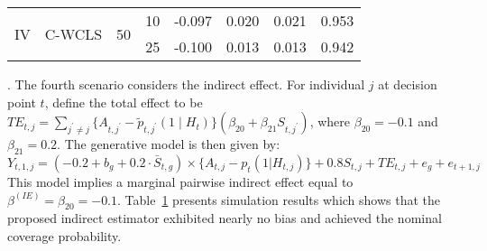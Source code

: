 \documentclass[lineno]{biometrika}
\begin{document}
\begin{table}[!th]
{\begin{tabular}{c ccccccc}
\multirow{2}{*}{IV}
& \multirow{2}{*}{C-WCLS} & \multirow{2}{*}{50} & 
10 & -0.097 & 0.020 & 0.021 & 0.953 \\
& & & 25 & -0.100 & 0.013 & 0.013 & 0.942 \\ %
\end{tabular}}
\label{tab:simresults}
\end{table}



.  The fourth scenario considers the indirect effect.  For individual $j$ at decision point $t$, define the total effect to be $TE_{t,j} = \sum_{j^\prime \neq j} \{A_{t,j^\prime} - \tilde p_{t, j^\prime} ( 1 \mid H_t) \} (\beta_{20} + \beta_{21} S_{t,j^\prime})$, where $\beta_{20} = -0.1$ and $\beta_{21} = 0.2$. The generative model is then given by:
\begin{equation*}
    Y_{t,1,j} = (-0.2 + b_g +  0.2 \cdot \bar S_{t,g}) \times \{A_{t,j} -p_t(1|H_{t,j})\}+ 0.8 S_{t,j} +TE_{t,j} +e_g +e_{t+1,j}
\end{equation*}
This model implies a marginal pairwise indirect effect equal to $\beta^{(IE)} = \beta_{20} = -0.1$. Table~\ref{tab:simresults} presents simulation results which shows that the proposed indirect estimator exhibited nearly no bias and achieved the nominal coverage probability. 
\end{document}
